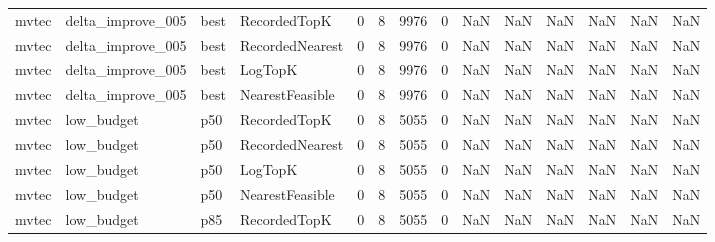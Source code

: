 \begin{tabular}{llllrrrrrrrrrr}
   mvtec &    delta\_improve\_005 &   best &    RecordedTopK &           0 &          8 &           9976 &                   0 &            NaN &             NaN &                       NaN &            NaN &                    NaN &                     NaN \\
   mvtec &    delta\_improve\_005 &   best & RecordedNearest &           0 &          8 &           9976 &                   0 &            NaN &             NaN &                       NaN &            NaN &                    NaN &                     NaN \\
   mvtec &    delta\_improve\_005 &   best &         LogTopK &           0 &          8 &           9976 &                   0 &            NaN &             NaN &                       NaN &            NaN &                    NaN &                     NaN \\
   mvtec &    delta\_improve\_005 &   best & NearestFeasible &           0 &          8 &           9976 &                   0 &            NaN &             NaN &                       NaN &            NaN &                    NaN &                     NaN \\
   mvtec &           low\_budget &    p50 &    RecordedTopK &           0 &          8 &           5055 &                   0 &            NaN &             NaN &                       NaN &            NaN &                    NaN &                     NaN \\
   mvtec &           low\_budget &    p50 & RecordedNearest &           0 &          8 &           5055 &                   0 &            NaN &             NaN &                       NaN &            NaN &                    NaN &                     NaN \\
   mvtec &           low\_budget &    p50 &         LogTopK &           0 &          8 &           5055 &                   0 &            NaN &             NaN &                       NaN &            NaN &                    NaN &                     NaN \\
   mvtec &           low\_budget &    p50 & NearestFeasible &           0 &          8 &           5055 &                   0 &            NaN &             NaN &                       NaN &            NaN &                    NaN &                     NaN \\
   mvtec &           low\_budget &    p85 &    RecordedTopK &           0 &          8 &           5055 &                   0 &            NaN &             NaN &                       NaN &            NaN &                    NaN &                     NaN \\

\end{tabular}

